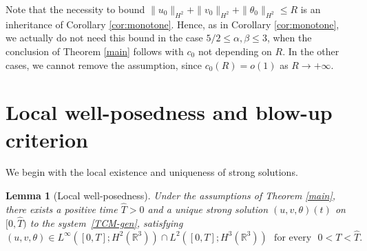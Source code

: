\documentclass[a4paper]{article}
\newtheorem{lem}[thm]{Lemma}
\newcommand{\R}{\mathbb{R}}
\begin{document}
  Note that the necessity to bound
  $\|u_0\|_{H^2}+\|v_0\|_{H^2}+\|\theta_0\|_{H^2}\le R$ is an
  inheritance of Corollary \ref{cor:monotone}. Hence, as in Corollary
  \ref{cor:monotone}, we actually do not need this bound in the case
 {$5/2 \le \alpha, \beta \le 3$}, when the conclusion of Theorem
  \ref{main} follows with $c_0$ not depending on $R$. In the other
  cases, we cannot remove the assumption, {since
    $c_0(R) =o(1)$ as $R \to +\infty$.}
  
  \section{Local well-posedness and blow-up criterion}\label{sec-stime}
%
We begin with the local existence and uniqueness of strong solutions.

  \begin{lem}[Local well-posedness] \label{bound-H2}
    Under the assumptions of Theorem \ref{main}, there exists a
    positive time $\hat T>0$ and a unique strong solution
    $(u, v, \theta)(t)$ on $[0, \hat T)$ to the system~\eqref{TCM-gen},
    satisfying
    \begin{equation*}
      (u, v, \theta) \in L^\infty([0, T]; H^2(\R^3))\cap L^2([0, T]; H^3(\R^3))
      \,\, \textrm{ for every }\,\, 0< T <\hat T.
    \end{equation*}
  \end{lem}
\end{document}
